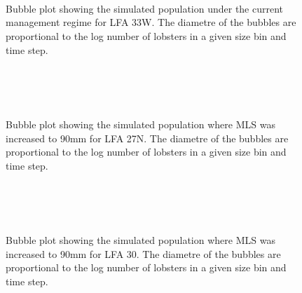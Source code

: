 \documentclass[11pt]{article}
\newcommand{\e}{\string~/bio.data/bio.lobster/figures/LFA2733Framework2018/} %
\begin{document}
    \begin{figure}
    \centering
                \\
                \\
                \\
        
         \caption{Bubble plot showing the simulated population under the current management regime for LFA 33W. The diametre of the bubbles are proportional to the log number of lobsters in a given size bin and time step.}
    \end{figure}
    


    \begin{figure}
    \centering
                \\
                \\
                \\
        
         \caption{Bubble plot showing the simulated population where MLS was increased to 90mm for LFA 27N. The diametre of the bubbles are proportional to the log number of lobsters in a given size bin and time step.}
    \end{figure}
    
    \begin{figure}
    \centering
                \\
                \\
                \\
        
         \caption{Bubble plot showing the simulated population where MLS was increased to 90mm for LFA 30. The diametre of the bubbles are proportional to the log number of lobsters in a given size bin and time step.}
    \end{figure}
    
\end{document}
